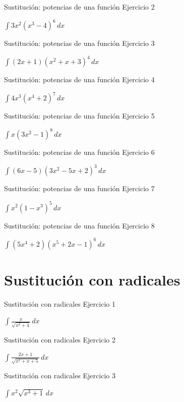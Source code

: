 \documentclass[10pt,aspectratio=169]{beamer}
\newcommand{\ejercicio}[1]{%
  \begin{center}
  \vfill
  {\fontsize{24}{30}\selectfont #1}
  \vfill
  \end{center}
}
\begin{document}
\begin{frame}{Sustitución: potencias de una función}
\small Ejercicio 2
\ejercicio{$\displaystyle \int 3x^2(x^3-4)^6\,dx$}
\end{frame}

\begin{frame}{Sustitución: potencias de una función}
\small Ejercicio 3
\ejercicio{$\displaystyle \int(2x+1)(x^2+x+3)^4\,dx$}
\end{frame}

\begin{frame}{Sustitución: potencias de una función}
\small Ejercicio 4
\ejercicio{$\displaystyle \int 4x^3(x^4+2)^7\,dx$}
\end{frame}

\begin{frame}{Sustitución: potencias de una función}
\small Ejercicio 5
\ejercicio{$\displaystyle \int x(3x^2-1)^8\,dx$}
\end{frame}

\begin{frame}{Sustitución: potencias de una función}
\small Ejercicio 6
\ejercicio{$\displaystyle \int(6x-5)(3x^2-5x+2)^3\,dx$}
\end{frame}

\begin{frame}{Sustitución: potencias de una función}
\small Ejercicio 7
\ejercicio{$\displaystyle \int x^2(1-x^3)^5\,dx$}
\end{frame}

\begin{frame}{Sustitución: potencias de una función}
\small Ejercicio 8
\ejercicio{$\displaystyle \int(5x^4+2)(x^5+2x-1)^6\,dx$}
\end{frame}

\section{Sustitución con radicales}
\begin{frame}{Sustitución con radicales}
\small Ejercicio 1
\ejercicio{$\displaystyle \int\frac{x}{\sqrt{x^2+4}}\,dx$}
\end{frame}

\begin{frame}{Sustitución con radicales}
\small Ejercicio 2
\ejercicio{$\displaystyle \int\frac{2x+1}{\sqrt{x^2+x+5}}\,dx$}
\end{frame}

\begin{frame}{Sustitución con radicales}
\small Ejercicio 3
\ejercicio{$\displaystyle \int x^2\sqrt{x^3+1}\,dx$}
\end{frame}
\end{document}
